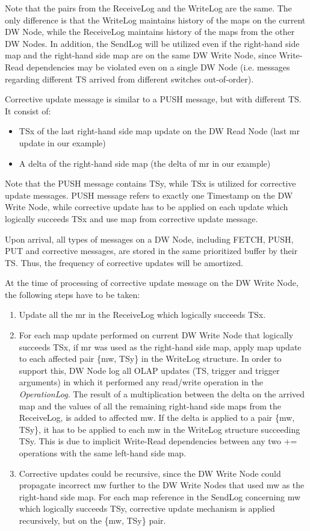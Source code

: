 \documentclass{sig-semester}
\def\OLAP{OLAP\xspace}
\begin{document}
Note that the pairs from the ReceiveLog and the WriteLog are the same. The only difference is that the WriteLog maintains history of the maps on the current DW Node, while the ReceiveLog maintains history of the maps from the other DW Nodes. In addition, the SendLog will be utilized even if the right-hand side map and the right-hand side map are on the same DW Write Node, since Write-Read dependencies may be violated even on a single DW Node (i.e. messages regarding different TS arrived from different switches out-of-order).

Corrective update message is similar to a PUSH message, but with different TS. It consist of:
\begin{itemize}
 \item TSx of the last right-hand side map update on the DW Read Node (last mr update in our example)
 \item A delta of the right-hand side map (the delta of mr in our example)
\end{itemize}

Note that the PUSH message contains TSy, while TSx is utilized for corrective update messages. PUSH message refers to exactly one Timestamp on the DW Write Node, while corrective update has to be applied on each update which logically succeeds TSx and use map from corrective update message.

Upon arrival, all types of messages on a DW Node, including FETCH, PUSH, PUT and corrective messages, are stored in the same prioritized buffer by their TS. Thus, the frequency of corrective updates will be amortized.

At the time of processing of corrective update message on the DW Write Node, the following steps have to be taken:
\begin{enumerate}[(1)]
 \item Update all the mr in the ReceiveLog which logically succeeds TSx.

 \item For each map update performed on current DW Write Node that logically succeeds TSx, if mr was used as the right-hand side map, apply map update to each affected pair \{mw, TSy\} in the WriteLog structure. In order to support this, DW Node log all \OLAP updates (TS, trigger and trigger arguments) in which it performed any read/write operation in the \textit{OperationLog}. The result of a multiplication between the delta on the arrived map and the values of all the remaining right-hand side maps from the ReceiveLog, is added to affected mw. If the delta is applied to a pair \{mw, TSy\}, it has to be applied to each mw in the WriteLog structure succeeding TSy. This is due to implicit Write-Read dependencies between any two += operations with the same left-hand side map.

 \item Corrective updates could be recursive, since the DW Write Node could propagate incorrect mw further to the DW Write Nodes that used mw as the right-hand side map. For each map reference in the SendLog concerning mw which logically succeeds TSy, corrective update mechanism is applied recursively, but on the \{mw, TSy\} pair.
\end{enumerate}
\end{document}
